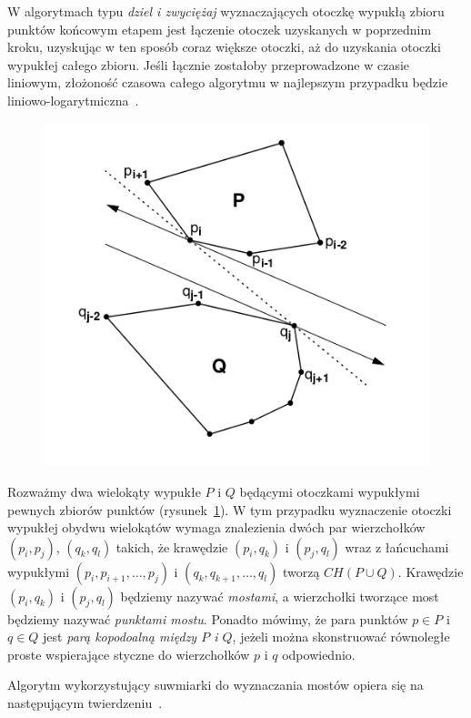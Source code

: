 W algorytmach typu \emph{dziel i zwyciężaj} wyznaczających otoczkę
wypukłą zbioru punktów końcowym etapem jest łączenie otoczek
uzyskanych w poprzednim kroku, uzyskując w ten sposób coraz większe
otoczki, aż do uzyskania otoczki wypukłej całego zbioru. Jeśli łącznie
zostałoby przeprowadzone w czasie liniowym, złożoność czasowa całego
algorytmu w najlepszym przypadku będzie
liniowo-logarytmiczna~\cite{Graham72}.

\begin{figure}[htb]
  \centering
  \includegraphics[scale=0.5]{img/calipers4}
  \caption{\label{img:calipers4}}
\end{figure}

Rozważmy dwa wielokąty wypukłe $P$ i $Q$ będącymi otoczkami wypukłymi
pewnych zbiorów punktów (rysunek~\ref{img:calipers4}). W tym przypadku
wyznaczenie otoczki wypukłej obydwu wielokątów wymaga znalezienia
dwóch par wierzchołków $(p_i, p_j)$, $(q_k, q_l)$ takich, że krawędzie
$(p_i, q_k)$ i $(p_j, q_l)$ wraz z łańcuchami wypukłymi $(p_i,
p_{i+1}, \ldots, p_j)$ i $(q_k, q_{k+1}, \ldots, q_l)$ tworzą $CH(P
\cup Q)$. Krawędzie $(p_i, q_k)$ i $(p_j, q_l)$ będziemy nazywać
\emph{mostami}, a wierzchołki tworzące most będziemy nazywać
\emph{punktami mostu}. Ponadto mówimy, że para punktów $p \in P$ i $q
\in Q$ jest \emph{parą kopodoalną między $P$ i $Q$}, jeżeli można
skonstruować równoległe proste wspierające styczne do wierzchołków $p$
i $q$ odpowiednio.

Algorytm wykorzystujący suwmiarki do wyznaczania mostów opiera się na
następującym twierdzeniu~\cite{Toussaint83}.

